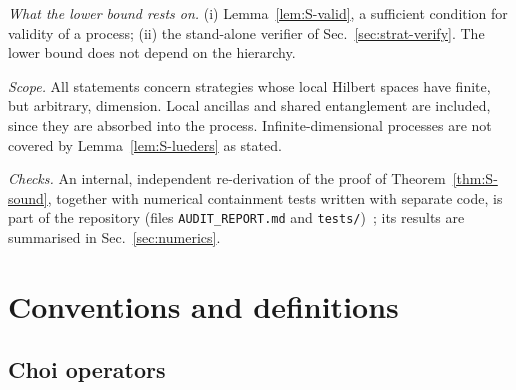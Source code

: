 \documentclass[aps,pra,onecolumn,notitlepage,superscriptaddress,longbibliography,nofootinbib,11pt]{revtex4-2}
\theoremstyle{remark}
\newcommand{\file}[1]{\texttt{#1}}
\begin{document}
\emph{What the lower bound rests on.} (i) Lemma~\ref{lem:S-valid}, a sufficient condition for validity of a process; (ii) the stand-alone verifier of Sec.~\ref{sec:strat-verify}. The lower bound does not depend on the hierarchy.

\emph{Scope.} All statements concern strategies whose local Hilbert spaces have finite, but arbitrary, dimension. Local ancillas and shared entanglement are included, since they are absorbed into the process. Infinite-dimensional processes are not covered by Lemma~\ref{lem:S-lueders} as stated.

\emph{Checks.} An internal, independent re-derivation of the proof of Theorem~\ref{thm:S-sound}, together with numerical containment tests written with separate code, is part of the repository (files \file{AUDIT\_REPORT.md} and \file{tests/})~\cite{repo}; its results are summarised in Sec.~\ref{sec:numerics}.

\section{Conventions and definitions}\label{sec:conventions}

\subsection{Choi operators}
\end{document}
